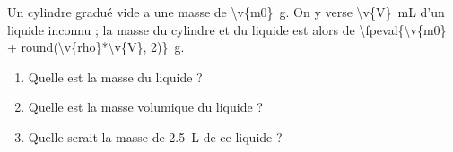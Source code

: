 Un cylindre gradué vide a une masse de \qty{\v{m0}}{g}. On y verse \qty{\v{V}}{mL} d'un liquide inconnu ; la masse du cylindre et du liquide est alors de \qty{\fpeval{\v{m0} + round(\v{rho}*\v{V}, 2)}}{g}.

\begin{enumerate}[label=\alph*)]
    \item Quelle est la masse du liquide ?
    \item Quelle est la masse volumique du liquide ?
    \item Quelle serait la masse de \qty{2.5}{L} de ce liquide ?
\end{enumerate}
